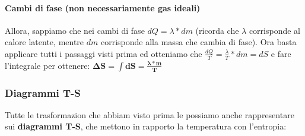                 \paragraph{Cambi di fase (non necessariamente gas ideali)}
                    Allora, sappiamo che nei cambi di fase $dQ = \lambda*dm$ (ricorda che $\lambda$ corrisponde al calore latente, mentre $dm$ corrisponde alla massa che cambia di fase). Ora basta applicare tutti i passaggi visti prima ed otteniamo che $\frac{dQ}{T} =\frac{\lambda}{T}*dm = dS$ e fare l'integrale per ottenere: \textcolor{OliveGreen}{$\mathbf{\Delta S = \int dS =\frac{\lambda*m}{T}}$}

            \subsubsection{Diagrammi T-S}
                Tutte le trasformazion che abbiam visto prima le possiamo anche rappresentare sui \textbf{diagrammi T-S}, che mettono in rapporto la temperatura con l'entropia:

